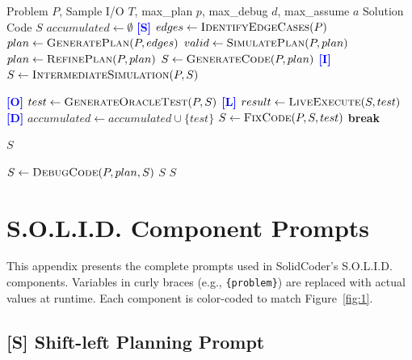 \documentclass[11pt]{article}
\begin{document}
\begin{algorithm}[h]
\caption{The SolidCoder Workflow}
\label{alg:solidcoder}
\small
\begin{algorithmic}[1]
\Require Problem $P$, Sample I/O $T$, max\_plan $p$, max\_debug $d$, max\_assume $a$
\Ensure Solution Code $S$
\State $accumulated \leftarrow \emptyset$
    \State \textcolor{blue}{\textbf{[S]}} $edges \leftarrow \Call{IdentifyEdgeCases}{P}$
    \State $plan \leftarrow \Call{GeneratePlan}{P, edges}$
    \State $valid \leftarrow \Call{SimulatePlan}{P, plan}$ 
        \State $plan \leftarrow \Call{RefinePlan}{P, plan}$
    \EndIf
    \State $S \leftarrow \Call{GenerateCode}{P, plan}$
    \State \textcolor{blue}{\textbf{[I]}} $S \leftarrow \Call{IntermediateSimulation}{P, S}$ 

     
        \State \textcolor{blue}{\textbf{[O]}} $test \leftarrow \Call{GenerateOracleTest}{P, S}$
        \State \textcolor{blue}{\textbf{[L]}} $result \leftarrow \Call{LiveExecute}{S, test}$
            \State \textcolor{blue}{\textbf{[D]}} $accumulated \leftarrow accumulated \cup \{test\}$
            \State $S \leftarrow \Call{FixCode}{P, S, test}$
        \Else
            \State \textbf{break} 
        \EndIf
    \EndFor

        \State \Return $S$
    \EndIf

     
        \State $S \leftarrow \Call{DebugCode}{P, plan, S}$
            \State \Return $S$
        \EndIf
    \EndFor
\EndFor
\State \Return $S$
\end{algorithmic}
\end{algorithm}

\section{S.O.L.I.D. Component Prompts}
\label{app:prompts}

This appendix presents the complete prompts used in SolidCoder's S.O.L.I.D. components. Variables in curly braces (e.g., \texttt{\{problem\}}) are replaced with actual values at runtime. Each component is color-coded to match Figure~\ref{fig:1}.

\subsection{[S] Shift-left Planning Prompt}
\end{document}
